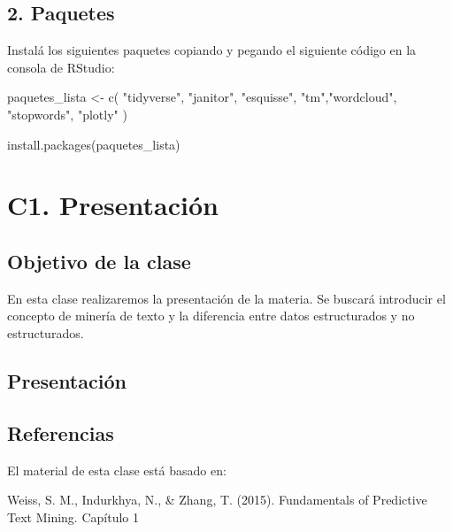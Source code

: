 \documentclass[
  letterpaper,
  DIV=11,
  numbers=noendperiod]{scrreprt}
\newenvironment{Shaded}{\begin{snugshade}}{\end{snugshade}}
\newcommand{\FunctionTok}[1]{\textcolor[rgb]{0.28,0.35,0.67}{#1}}
\newcommand{\NormalTok}[1]{\textcolor[rgb]{0.00,0.23,0.31}{#1}}
\newcommand{\OtherTok}[1]{\textcolor[rgb]{0.00,0.23,0.31}{#1}}
\newcommand{\StringTok}[1]{\textcolor[rgb]{0.13,0.47,0.30}{#1}}
\begin{document}
\section{\texorpdfstring{\textbf{2.
Paquetes}}{2. Paquetes}}\label{paquetes}

Instalá los siguientes paquetes copiando y pegando el siguiente código
en la consola de RStudio:

\begin{Shaded}
\begin{Highlighting}[]

\NormalTok{paquetes\_lista }\OtherTok{\textless{}{-}} \FunctionTok{c}\NormalTok{(}
  \StringTok{"tidyverse"}\NormalTok{, }\StringTok{"janitor"}\NormalTok{, }\StringTok{"esquisse"}\NormalTok{, }\StringTok{"tm"}\NormalTok{,}\StringTok{"wordcloud"}\NormalTok{, }\StringTok{"stopwords"}\NormalTok{, }\StringTok{"plotly"}
\NormalTok{)}

\FunctionTok{install.packages}\NormalTok{(paquetes\_lista)}
\end{Highlighting}
\end{Shaded}

\chapter{C1. Presentación}\label{c1.-presentaciuxf3n}

\section{\texorpdfstring{\textbf{Objetivo de la
clase}}{Objetivo de la clase}}\label{objetivo-de-la-clase}

En esta clase realizaremos la presentación de la materia. Se buscará
introducir el concepto de minería de texto y la diferencia entre datos
estructurados y no estructurados.

\section{\texorpdfstring{\textbf{Presentación}}{Presentación}}\label{presentaciuxf3n}

\section{\texorpdfstring{\textbf{Referencias}}{Referencias}}\label{referencias}

El material de esta clase está basado en:

Weiss, S. M., Indurkhya, N., \& Zhang, T. (2015). Fundamentals of
Predictive Text Mining. Capítulo 1
\end{document}
